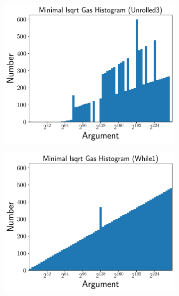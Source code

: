 \begin{figure}[p]
\centering
    \begin{subfigure}[t]{0.45\textwidth}
    \includegraphics[width=\textwidth]{plots/minimal_hist_Unrolled3_ed.pdf}
    \end{subfigure}
    \begin{subfigure}[t]{0.45\textwidth}
    \includegraphics[width=\textwidth]{plots/minimal_hist_While1_ed.pdf}
    \end{subfigure}


\end{figure}
